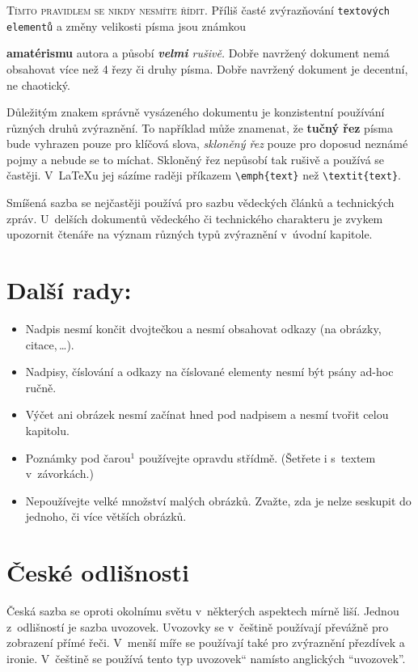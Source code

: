 \documentclass[10pt,a4paper,twocolumn]{article}
\newcommand\czuv[1]{\quotedblbase #1\textquotedblleft}
\begin{document}
\textsc{Tímto pravidlem se nikdy nesmíte řídit.} \textsf{Příliš časté} zvýrazňování \texttt{textových elementů} a změny {\small velikosti} {\large písma} {\Large jsou} {\LARGE známkou} {\textbf {\huge {amatérismu}} autora a působí \textit{\textbf {velmi} rušivě.} Dobře navržený dokument nemá obsahovat více než 4 řezy či druhy písma. Dobře navržený dokument je decentní, ne chaotický.

Důležitým znakem správně vysázeného dokumentu je konzistentní používání různých druhů zvýraznění. To například může znamenat, že \textbf {tučný řez} písma bude vyhrazen pouze pro klíčová slova, \textit{skloněný řez} pouze pro doposud neznámé pojmy a nebude se to míchat. Skloněný řez nepůsobí tak rušivě a používá se častěji. V~\LaTeX u jej sázíme raději příkazem \verb|\emph{text}| než \verb|\textit{text}|.

Smíšená sazba se nejčastěji používá pro sazbu vědeckých článků a technických zpráv. U~delších dokumentů vědeckého či technického charakteru je zvykem upozornit čtenáře na význam různých typů zvýraznění v~úvodní kapitole.

\section{Další rady:}
\begin{itemize}
	\item Nadpis nesmí končit dvojtečkou a nesmí obsahovat odkazy (na obrázky, citace,\,\dots).
	\item Nadpisy, číslování a odkazy na číslované elementy nesmí být psány ad-hoc ručně.
	\item Výčet ani obrázek nesmí začínat hned pod nadpisem a nesmí tvořit celou kapitolu.
	\item Poznámky pod čarou$^1$ používejte opravdu střídmě. (Šetřete i s~textem v~závorkách.)
	\item Nepoužívejte velké množství malých obrázků. Zvažte, zda je nelze seskupit do jednoho, či více větších obrázků.
\end{itemize}

\section{České odlišnosti}
Česká sazba se oproti okolnímu světu v~některých aspektech mírně liší. Jednou z~odlišností je sazba uvozovek. Uvozovky se v~češtině používají převážně pro zobrazení přímé řeči. V~menší míře se používají také pro zvýraznění přezdívek a ironie. V~češtině se používá tento \czuv{typ uvozovek} namísto anglických ``uvozovek''.

}
\end{document}
